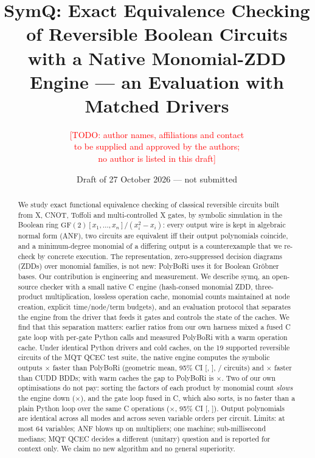 \documentclass[10pt,a4paper]{article}
\title{SymQ: Exact Equivalence Checking of Reversible Boolean Circuits\\
with a Native Monomial-ZDD Engine --- an Evaluation with Matched Drivers}
\author{\textcolor{red}{[TODO: author names, affiliations and contact}\\
\textcolor{red}{to be supplied and approved by the authors;}\\
\textcolor{red}{no author is listed in this draft]}}
\date{Draft of 27 October 2026 --- not submitted}
\theoremstyle{definition}
\newcommand{\symq}{\textsf{symq}}
\newcommand{\GF}{\mathrm{GF}(2)}
\begin{document}
\maketitle

\begin{abstract}
We study exact functional equivalence checking of classical reversible circuits built from
X, CNOT, Toffoli and multi-controlled X gates, by symbolic simulation in the Boolean ring
$\GF[x_1,\dots,x_n]/(x_i^2-x_i)$: every output wire is kept in algebraic normal form (ANF), two
circuits are equivalent iff their output polynomials coincide, and a minimum-degree monomial
of a differing output is a counterexample that we re-check by concrete execution. The
representation, zero-suppressed decision diagrams (ZDDs) over monomial families, is not new:
PolyBoRi uses it for Boolean Gr\"obner bases. Our contribution is engineering and
measurement. We describe \symq{}, an open-source checker with a small native C engine
(hash-consed monomial ZDD, three-product multiplication, lossless operation cache, monomial
counts maintained at node creation, explicit time/node/term budgets), and an evaluation
protocol that separates the engine from the driver that feeds it gates and controls the
state of the caches. We find that this separation matters: earlier ratios from our own
harness mixed a fused C gate loop with per-gate Python calls and measured PolyBoRi with a
warm operation cache. Under identical Python drivers and cold caches, on the 19 supported
reversible circuits of the MQT QCEC test suite, the native engine computes the symbolic
outputs \QPBSim$\times$ faster than PolyBoRi (geometric mean, 95\% CI
[\QPBSimLo, \QPBSimHi], \QPBSimWins/\QPBSimN{} circuits) and \QBDDSim$\times$ faster than
CUDD BDDs; with warm caches the gap to PolyBoRi is \QPBSimWarm$\times$. Two of our own
optimisations do not pay: sorting the factors of each product by monomial count
\emph{slows} the engine down (\QSortingSim$\times$), and the gate loop fused in C, which also
sorts, is no faster than a plain Python loop over the same C operations
(\QFusedVsLoopSim$\times$, 95\% CI [\QFusedVsLoopSimLo, \QFusedVsLoopSimHi]). Output
polynomials are identical across all modes and across seven variable orders per circuit.
\BlindAbstract{} Limits: at most 64 variables; ANF blows up on multipliers; one
machine; sub-millisecond medians; MQT QCEC decides a different (unitary) question and is
reported for context only. We claim no new algorithm and no general superiority.
\end{abstract}
\end{document}
